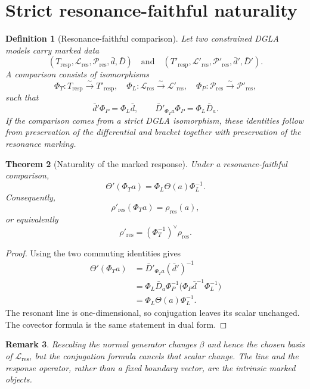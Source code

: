 \documentclass[11pt]{amsart}
\newtheorem{theorem}{Theorem}[section]
\newtheorem{definition}[theorem]{Definition}
\newtheorem{remark}[theorem]{Remark}
\begin{document}
\section{Strict resonance-faithful naturality}

\begin{definition}[Resonance-faithful comparison]
Let two constrained DGLA models carry marked data
\[
(T_{\mathrm{resp}},\mathcal L_{\mathrm{res}},\mathcal P_{\mathrm{res}},\bar d,\bar D)
\quad\text{and}\quad
(T'_{\mathrm{resp}},\mathcal L'_{\mathrm{res}},\mathcal P'_{\mathrm{res}},\bar d',\bar D').
\]
A comparison consists of isomorphisms
\[
\Phi_T:T_{\mathrm{resp}}\xrightarrow{\sim}T'_{\mathrm{resp}},
\quad
\Phi_L:\mathcal L_{\mathrm{res}}\xrightarrow{\sim}\mathcal L'_{\mathrm{res}},
\quad
\Phi_P:\mathcal P_{\mathrm{res}}\xrightarrow{\sim}\mathcal P'_{\mathrm{res}},
\]
such that
\[
\bar d'\Phi_P=\Phi_L\bar d,
\qquad
\bar D'_{\Phi_Ta}\Phi_P=\Phi_L\bar D_a.
\]
If the comparison comes from a strict DGLA isomorphism, these identities follow from preservation of the differential and bracket together with preservation of the resonance marking.
\end{definition}

\begin{theorem}[Naturality of the marked response]
Under a resonance-faithful comparison,
\[
\boxed{
\Theta'(\Phi_Ta)=\Phi_L\Theta(a)\Phi_L^{-1}.}
\]
Consequently,
\[
\boxed{
\rho'_{\mathrm{res}}(\Phi_Ta)=\rho_{\mathrm{res}}(a),}
\]
or equivalently
\[
\rho'_{\mathrm{res}}=(\Phi_T^{-1})^\vee\rho_{\mathrm{res}}.
\]
\end{theorem}

\begin{proof}
Using the two commuting identities gives
\[
\begin{aligned}
\Theta'(\Phi_Ta)
&=\bar D'_{\Phi_Ta}(\bar d')^{-1}\\
&=\Phi_L\bar D_a\Phi_P^{-1}
       \bigl(\Phi_P\bar d^{-1}\Phi_L^{-1}\bigr)\\
&=\Phi_L\Theta(a)\Phi_L^{-1}.
\end{aligned}
\]
The resonant line is one-dimensional, so conjugation leaves its scalar unchanged.  The covector formula is the same statement in dual form.
\end{proof}

\begin{remark}
Rescaling the normal generator changes \(\beta\) and hence the chosen basis of \(\mathcal L_{\mathrm{res}}\), but the conjugation formula cancels that scalar change.  The line and the response operator, rather than a fixed boundary vector, are the intrinsic marked objects.
\end{remark}
\end{document}
